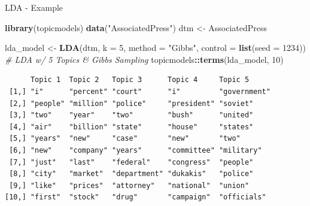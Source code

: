 \documentclass[
  ignorenonframetext,
  aspectratio=169]{beamer}
\newenvironment{Shaded}{\begin{snugshade}}{\end{snugshade}}
\newcommand{\AttributeTok}[1]{\textcolor[rgb]{0.13,0.29,0.53}{#1}}
\newcommand{\CommentTok}[1]{\textcolor[rgb]{0.56,0.35,0.01}{\textit{#1}}}
\newcommand{\DecValTok}[1]{\textcolor[rgb]{0.00,0.00,0.81}{#1}}
\newcommand{\FunctionTok}[1]{\textcolor[rgb]{0.13,0.29,0.53}{\textbf{#1}}}
\newcommand{\NormalTok}[1]{#1}
\newcommand{\OtherTok}[1]{\textcolor[rgb]{0.56,0.35,0.01}{#1}}
\newcommand{\SpecialCharTok}[1]{\textcolor[rgb]{0.81,0.36,0.00}{\textbf{#1}}}
\newcommand{\StringTok}[1]{\textcolor[rgb]{0.31,0.60,0.02}{#1}}
\begin{document}
\begin{frame}[fragile]{LDA - Example}
\label{lda---example}
\scriptsize

\begin{Shaded}
\begin{Highlighting}[]
\FunctionTok{library}\NormalTok{(topicmodels)}
\FunctionTok{data}\NormalTok{(}\StringTok{"AssociatedPress"}\NormalTok{)}
\NormalTok{dtm }\OtherTok{\textless{}{-}}\NormalTok{ AssociatedPress}

\NormalTok{lda\_model }\OtherTok{\textless{}{-}} \FunctionTok{LDA}\NormalTok{(dtm, }\AttributeTok{k =} \DecValTok{5}\NormalTok{, }\AttributeTok{method =} \StringTok{"Gibbs"}\NormalTok{, }\AttributeTok{control =} \FunctionTok{list}\NormalTok{(}\AttributeTok{seed =} \DecValTok{1234}\NormalTok{)) }\CommentTok{\# LDA w/ 5 Topics \& Gibbs Sampling }
\NormalTok{topicmodels}\SpecialCharTok{::}\FunctionTok{terms}\NormalTok{(lda\_model, }\DecValTok{10}\NormalTok{) }
\end{Highlighting}
\end{Shaded}

\begin{verbatim}
      Topic 1  Topic 2   Topic 3      Topic 4     Topic 5     
 [1,] "i"      "percent" "court"      "i"         "government"
 [2,] "people" "million" "police"     "president" "soviet"    
 [3,] "two"    "year"    "two"        "bush"      "united"    
 [4,] "air"    "billion" "state"      "house"     "states"    
 [5,] "years"  "new"     "case"       "new"       "two"       
 [6,] "new"    "company" "years"      "committee" "military"  
 [7,] "just"   "last"    "federal"    "congress"  "people"    
 [8,] "city"   "market"  "department" "dukakis"   "police"    
 [9,] "like"   "prices"  "attorney"   "national"  "union"     
[10,] "first"  "stock"   "drug"       "campaign"  "officials" 
\end{verbatim}
\end{frame}
\end{document}
